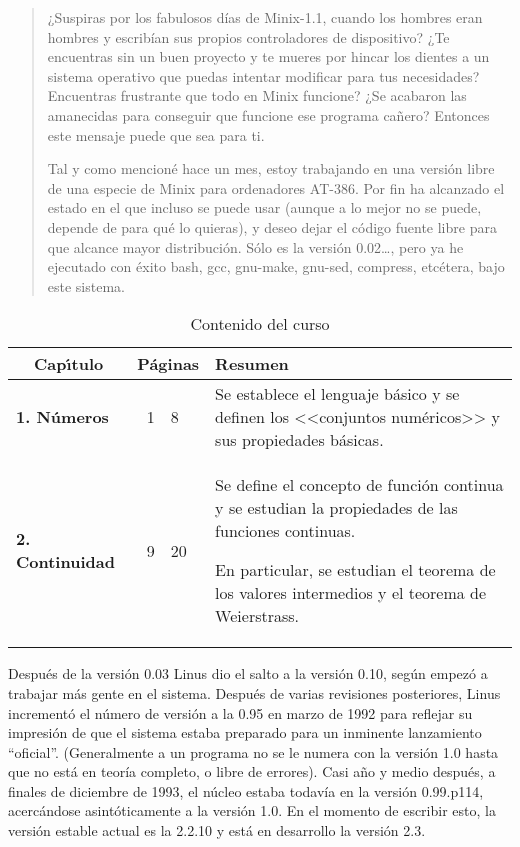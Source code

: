 \begin{quote}
¿Suspiras por los fabulosos días de Minix-1.1, cuando los hombres
eran hombres y escribían sus propios controladores de dispositivo? ¿Te
encuentras sin un buen proyecto y te mueres por hincar los dientes a
un sistema operativo que puedas intentar modificar para tus
necesidades? Encuentras frustrante que todo en Minix funcione? ¿Se
acabaron las amanecidas para conseguir que funcione ese programa
cañero? Entonces este mensaje puede que sea para ti.

Tal y como mencioné hace un mes, estoy trabajando en una versión
libre de una especie de Minix para ordenadores AT-386. Por fin ha
alcanzado el estado en el que incluso se puede usar (aunque a lo mejor
no se puede, depende de para qué lo quieras), y deseo dejar el código
fuente libre para que alcance mayor distribución. Sólo es la versión
0.02\dots, pero ya he ejecutado con éxito bash, gcc, gnu-make, gnu-sed,
compress, etcétera, bajo este sistema.
\end{quote}

\begin{table}
\centering
\begin{tabular}{lr@{\,--\,}lp{5.8cm}}
\multicolumn{1}{c}{\bf Cap\'\i tulo}
        & \multicolumn{2}{c}{\bf P\'aginas}
           & \multicolumn{1}{l}{\bf Resumen}\\\hline
\textbf{1. N\'umeros} & 1 & 8 &%
Se establece el lenguaje b\'asico y se definen los <<conjuntos num\'ericos>>  y
sus propiedades b\'asicas.\\
\textbf{2. Continuidad} & 9 & 20 &%
Se define el concepto de funci\'on
continua y se estudian la propiedades de las funciones continuas.

En particular, se estudian el teorema de los valores intermedios y el teorema de
Weierstrass.\\\hline
\end{tabular}
\caption{Contenido del curso}
\end{table}

Después de la versión 0.03 Linus dio el salto a la versión 0.10, según
empezó a trabajar más gente en el sistema. Después de varias
revisiones posteriores, Linus incrementó el número de versión a la
0.95 en marzo de 1992 para reflejar su impresión de que el sistema
estaba preparado para un inminente lanzamiento ``oficial''.
(Generalmente a un programa no se le numera con la versión 1.0 hasta
que no está en teoría completo, o libre de errores). Casi a\~no y medio
después, a finales de diciembre de 1993, el núcleo  estaba todavía
en la versión 0.99.p114, acercándose asintóticamente a la versión 1.0.
En el momento de escribir esto, la versión estable actual es la 2.2.10
y está en desarrollo la versión 2.3.

